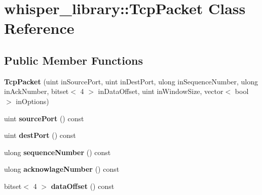 \hypertarget{classwhisper__library_1_1TcpPacket}{\section{whisper\-\_\-library\-:\-:\-Tcp\-Packet \-Class \-Reference}
\label{classwhisper__library_1_1TcpPacket}
}
\subsection*{\-Public \-Member \-Functions}
\begin{DoxyCompactItemize}
\item 
\hypertarget{classwhisper__library_1_1TcpPacket_ae6e80d2107091af927ded7f07ebe7764}{{\bfseries \-Tcp\-Packet} (uint in\-Source\-Port, uint in\-Dest\-Port, ulong in\-Sequence\-Number, ulong in\-Ack\-Number, bitset$<$ 4 $>$ in\-Data\-Offset, uint in\-Window\-Size, vector$<$ bool $>$ in\-Options)}\label{classwhisper__library_1_1TcpPacket_ae6e80d2107091af927ded7f07ebe7764}

\item 
\hypertarget{classwhisper__library_1_1TcpPacket_a234bca8357dac29382195f9837363d0c}{uint {\bfseries source\-Port} () const }\label{classwhisper__library_1_1TcpPacket_a234bca8357dac29382195f9837363d0c}

\item 
\hypertarget{classwhisper__library_1_1TcpPacket_a7909f3bae44646ebd02930ee8e1d0fb1}{uint {\bfseries dest\-Port} () const }\label{classwhisper__library_1_1TcpPacket_a7909f3bae44646ebd02930ee8e1d0fb1}

\item 
\hypertarget{classwhisper__library_1_1TcpPacket_a959a01e2dedde0b62cae354a8ebad1a3}{ulong {\bfseries sequence\-Number} () const }\label{classwhisper__library_1_1TcpPacket_a959a01e2dedde0b62cae354a8ebad1a3}

\item 
\hypertarget{classwhisper__library_1_1TcpPacket_ac088334e95fa850fc11491c5e0b51ee5}{ulong {\bfseries acknowlage\-Number} () const }\label{classwhisper__library_1_1TcpPacket_ac088334e95fa850fc11491c5e0b51ee5}

\item 
\hypertarget{classwhisper__library_1_1TcpPacket_a42d4d2907a5b77c5da1613b64b335c30}{bitset$<$ 4 $>$ {\bfseries data\-Offset} () const }\label{classwhisper__library_1_1TcpPacket_a42d4d2907a5b77c5da1613b64b335c30}


\end{DoxyCompactItemize}
